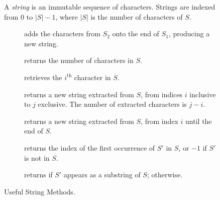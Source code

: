 \begin{figure}[tp]
  \small
  \begin{tcolorbox}[title=String Class]
    A \textit{string} is an immutable sequence of characters. Strings are indexed from $0$ to $|S|-1$, where $|S|$ is the number of characters of $S$.
    \vspace{2ex}
  \begin{description}
    \item[] adds the characters from $S_2$ onto the end of $S_1$, producing a new string.
    \item[] returns the number of characters in $S$.
    \item[] retrieves the $i^\text{th}$ character in $S$.
    \item[] returns a new string extracted from $S$, from indices $i$ inclusive to $j$ exclusive. The number of extracted characters is $j-i$.
    \item[] returns a new string extracted from $S$, from index $i$ until the end of $S$.
    \item[] returns the index of the first occurrence of $S'$ in $S$, or $-1$ if $S'$ is not in $S$.
    \item[] returns  if $S'$ appears as a substring of $S$;  otherwise.
  \end{description}
\end{tcolorbox}
  \caption{Useful String Methods.}
  \label{fig:strings}
\end{figure}
